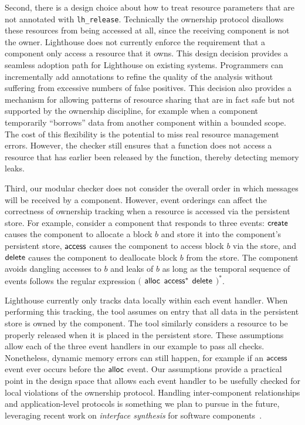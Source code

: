 Second, there is a design choice about how to treat resource parameters that
are not annotated with {\tt lh\_release}.  Technically the ownership
protocol disallows these resources from being accessed at all, since the
receiving component is not the owner.  
%
Lighthouse does not currently enforce the requirement that a component only
access a resource that it owns.
% 
This design decision provides a seamless adoption path for Lighthouse on
existing systems.  
%
Programmers can incrementally add annotations to refine the quality of the
analysis without suffering from excessive numbers of false positives.
%
This decision also provides a mechanism for allowing patterns of resource
sharing that are in fact safe but not supported by the ownership discipline,
for example when a component temporarily ``borrows'' data from another
component within a bounded scope.
%
The cost of this flexibility is the potential to miss real resource
management errors.
%
However, the checker still ensures that a function does not access a
resource that has earlier been released by the function, thereby detecting
memory leaks.



Third, our modular checker does not consider the overall order in which
messages will be received by a component.  
%
However, event orderings can affect the correctness of ownership tracking
when a resource is accessed via the persistent store.
%
For example, consider a component that responds to three events: ${\mathsf{create}}$
causes the component to allocate a block $b$ and store it into the
component's persistent store, ${\mathsf{access}}$ causes the component to access block
$b$ via the store, and ${\mathsf{delete}}$ causes the component to deallocate block
$b$ from the store.  
%
The component avoids dangling accesses to $b$ and leaks of $b$ as long as
the temporal sequence of events follows the regular expression $($ ${\mathsf{alloc}}$
${\mathsf{access}}^*$ ${\mathsf{delete}}$ $)^*$.  



Lighthouse currently only tracks data locally within each event handler.  
%
When performing this tracking, the tool assumes on entry that all data in
the persistent store is owned by the component.
%
The tool similarly considers a resource to be properly released when it is
placed in the persistent store.  
%
These assumptions allow each of the three event handlers in our example to
pass all checks.  
%
Nonetheless, dynamic memory errors can still happen, for example if an
${\mathsf{access}}$ event ever occurs before the ${\mathsf{alloc}}$ event.  
%
Our assumptions provide a practical point in the design space that allows
each event handler to be usefully checked for local violations of the
ownership protocol.  
%
Handling inter-component relationships and application-level protocols is
something we plan to pursue in the future, leveraging recent work on {\em
interface synthesis} for software components~\cite{AlurPOPL05,HJM05}.

